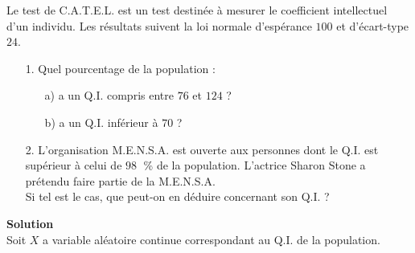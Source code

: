 Le test de C.A.T.E.L. est un test destinée à mesurer le coefficient intellectuel d'un individu. Les résultats suivent la loi normale d'espérance $100$ et d'écart-type  $24$. \\

\begin{itemize}
\item[1.] Quel pourcentage de la population : \\
\begin{itemize}
\item[a)] a un Q.I. compris entre $76$ et $124$ ?
\item[b)] a un Q.I. inférieur à $70$ ? \\
\end{itemize}

\item[2.] L'organisation M.E.N.S.A. est ouverte aux personnes dont le Q.I. est supérieur à celui de $98 \;$ \% de la population. L'actrice Sharon Stone a prétendu faire partie de la M.E.N.S.A. \\
Si tel est le cas, que peut-on en déduire concernant son Q.I. ?
\end{itemize}

\vspace*{.3cm}

\textbf{Solution} \\

Soit $X$ a variable aléatoire continue correspondant au Q.I. de la population. \\

